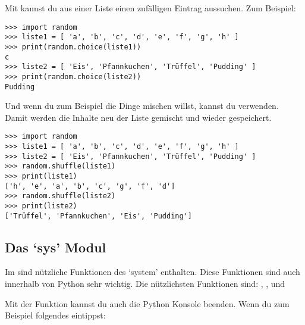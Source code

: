 Mit  kannst du aus einer Liste einen zufälligen Eintrag aussuchen. Zum Beispiel:

\begin{Verbatim}[frame=single]
>>> import random
>>> liste1 = [ 'a', 'b', 'c', 'd', 'e', 'f', 'g', 'h' ]
>>> print(random.choice(liste1))
c
>>> liste2 = [ 'Eis', 'Pfannkuchen', 'Trüffel', 'Pudding' ]
>>> print(random.choice(liste2))
Pudding
\end{Verbatim}

Und wenn du zum Beispiel die Dinge mischen willst, kannst du  verwenden. Damit werden die Inhalte neu der Liste gemischt und wieder gespeichert.

\begin{Verbatim}[frame=single]
>>> import random
>>> liste1 = [ 'a', 'b', 'c', 'd', 'e', 'f', 'g', 'h' ]
>>> liste2 = [ 'Eis', 'Pfannkuchen', 'Trüffel', 'Pudding' ]
>>> random.shuffle(liste1)
>>> print(liste1)
['h', 'e', 'a', 'b', 'c', 'g', 'f', 'd']
>>> random.shuffle(liste2)
>>> print(liste2)
['Trüffel', 'Pfannkuchen', 'Eis', 'Pudding']
\end{Verbatim}

\subsection*{Das `sys' Modul}

Im  sind nützliche Funktionen des `system' enthalten. Diese Funktionen sind auch innerhalb von Python sehr wichtig. Die nützlichsten Funktionen sind: , ,  und 
\par
Mit der  Funktion kannst du auch die Python Konsole beenden. Wenn du zum Beispiel folgendes eintippst:

